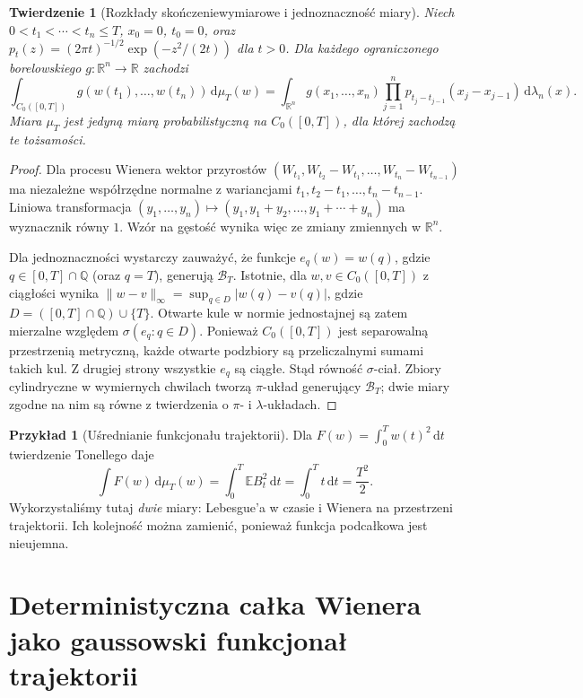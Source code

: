 \documentclass[11pt,a4paper,oneside]{report}
\numberwithin{equation}{chapter}
\theoremstyle{plain}
\newtheorem{twierdzenie}{Twierdzenie}[chapter]
\theoremstyle{definition}
\newtheorem{przyklad}{Przykład}[chapter]
\theoremstyle{remark}
\newcommand{\R}{\mathbb{R}}
\newcommand{\Q}{\mathbb{Q}}
\newcommand{\E}{\mathbb{E}}
\newcommand{\dd}{\mathrm{d}}
\begin{document}
\begin{twierdzenie}[Rozkłady skończeniewymiarowe i jednoznaczność miary]
\label{th:wiener-cyl}
Niech $0<t_1<\cdots<t_n\le T$, $x_0=0$, $t_0=0$, oraz
$p_t(z)=(2\pi t)^{-1/2}\exp(-z^2/(2t))$ dla $t>0$.
Dla każdego ograniczonego borelowskiego $g:\R^n\to\R$ zachodzi
\[
\int_{C_0([0,T])}g(w(t_1),\ldots,w(t_n))\,\dd\mu_T(w)
=\int_{\R^n}g(x_1,\ldots,x_n)
\prod_{j=1}^n p_{t_j-t_{j-1}}(x_j-x_{j-1})
\,\dd\lambda_n(x).
\]
Miara $\mu_T$ jest jedyną miarą probabilistyczną na
$C_0([0,T])$, dla której zachodzą te tożsamości.
\end{twierdzenie}
\begin{proof}
Dla procesu Wienera wektor przyrostów
$(W_{t_1},W_{t_2}-W_{t_1},\ldots,W_{t_n}-W_{t_{n-1}})$
ma niezależne współrzędne normalne z wariancjami
$t_1,t_2-t_1,\ldots,t_n-t_{n-1}$. Liniowa transformacja
$(y_1,\ldots,y_n)\mapsto(y_1,y_1+y_2,\ldots,y_1+\cdots+y_n)$
ma wyznacznik równy $1$. Wzór na gęstość wynika więc ze
zmiany zmiennych w $\R^n$.

Dla jednoznaczności wystarczy zauważyć, że funkcje
$e_q(w)=w(q)$, gdzie $q\in[0,T]\cap\Q$ (oraz $q=T$),
generują $\mathcal B_T$. Istotnie, dla $w,v\in C_0([0,T])$
z ciągłości wynika
$\|w-v\|_\infty=\sup_{q\in D}|w(q)-v(q)|$, gdzie
$D=([0,T]\cap\Q)\cup\{T\}$. Otwarte kule w normie
jednostajnej są zatem mierzalne względem
$\sigma(e_q:q\in D)$. Ponieważ $C_0([0,T])$ jest
separowalną przestrzenią metryczną, każde otwarte podzbiory
są przeliczalnymi sumami takich kul. Z drugiej strony
wszystkie $e_q$ są ciągłe. Stąd równość $\sigma$-ciał.
Zbiory cylindryczne w wymiernych chwilach tworzą
$\pi$-układ generujący $\mathcal B_T$; dwie miary
zgodne na nim są równe z twierdzenia o $\pi$- i $\lambda$-układach.
\end{proof}

\begin{przyklad}[Uśrednianie funkcjonału trajektorii]
Dla $F(w)=\int_0^T w(t)^2\,\dd t$ twierdzenie Tonellego daje
\[
\int F(w)\,\dd\mu_T(w)
=\int_0^T\E B_t^2\,\dd t
=\int_0^Tt\,\dd t=\frac{T^2}{2}.
\]
Wykorzystaliśmy tutaj \emph{dwie} miary: Lebesgue'a w czasie i
Wienera na przestrzeni trajektorii. Ich kolejność można zamienić,
ponieważ funkcja podcałkowa jest nieujemna.
\end{przyklad}

\section{Deterministyczna całka Wienera jako gaussowski funkcjonał trajektorii}
\end{document}
